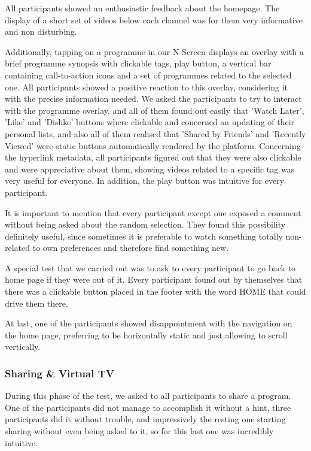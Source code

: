 \documentclass{acm_proc_article-sp}
\begin{document}
All participants showed an enthusiastic feedback about the homepage. The display of a short set of videos below each channel was for them very informative and non disturbing. 

Additionally, tapping on a programme in our N-Screen displays an overlay with a brief programme synopsis with clickable tags, play button, a vertical bar containing call-to-action icons and a set of programmes related to the selected one. All participants showed a positive reaction to this overlay, considering it with the precise information needed. We asked the participants to try to interact with the programme overlay, and all of them found out easily that 'Watch Later', 'Like' and 'Dislike' buttons where clickable and concerned an updating of their personal lists, and also all of them realised that 'Shared by Friends' and 'Recently Viewed' were static buttons automatically rendered by the platform. Concerning the hyperlink metadata, all participants figured out that they were also clickable and were appreciative about them, showing videos related to a specific tag was very useful for everyone.  In addition, the play button was intuitive for every participant.  

It is important to mention that every participant except one exposed a comment without being asked about the random selection. They found this possibility definitely useful, since sometimes it is preferable to watch something totally non-related to own preferences and therefore find something new. 

A special test that we carried out was to ask to every participant to go back to home page if they were out of it. Every participant found out by themselves that there was a clickable button placed in the footer with the word HOME that could drive them there. 

At last, one of the participants showed disappointment with the navigation on the home page, preferring to be horizontally static and just allowing to scroll vertically. 
\subsubsection{Sharing \& Virtual TV}
 
During this phase of the test, we asked to all participants to share a program. One of the participants did not manage to accomplish it without a hint, three participants did it without trouble, and impressively the resting one starting sharing without even being asked to it, so for this last one was incredibly intuitive. 
\end{document}
